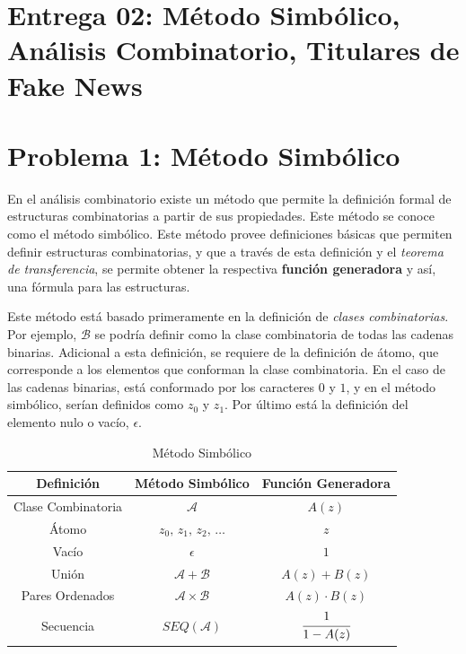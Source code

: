 \clearpage\section{Entrega 02: Método Simbólico, Análisis Combinatorio, Titulares de Fake News}
\section*{Problema 1: Método Simbólico}
En el análisis combinatorio existe un método que permite la definición formal de estructuras combinatorias a partir de sus propiedades. Este método se conoce como el método simbólico. Este método provee definiciones básicas que permiten definir estructuras combinatorias, y que a través de esta definición y el \textit{teorema de transferencia}, se permite obtener la respectiva \textbf{función generadora} y así, una fórmula para las estructuras.

Este método está basado primeramente en la definición de \textit{clases combinatorias}. Por ejemplo, $\mathcal{B}$ se podría definir como la clase combinatoria de todas las cadenas binarias. Adicional a esta definición, se requiere de la definición de átomo, que corresponde a los elementos que conforman la clase combinatoria. En el caso de las cadenas binarias, está conformado por los caracteres $0$ y $1$, y en el método simbólico, serían definidos como $z_0$ y $z_1$. Por último está la definición del elemento nulo o vacío, $\epsilon$.

\begin{table}[h!]
    \centering
    \begin{tabular}{|c|c|c|}
    \hline
        Definición &  Método Simbólico & Función Generadora\\
    \hline
        Clase Combinatoria & $\mathcal{A}$ &  $A(z)$\\
    \hline
        Átomo & $z_0,\,z_1,\,z_2,\,\dots$ & $z$ \\
    \hline 
        Vacío & $\epsilon$ & $1$ \\
    \hline
        Unión  & $\mathcal{A} + \mathcal{B}$ & $A(z) + B(z)$\\
    \hline
        Pares Ordenados & $\mathcal{A}\times\mathcal{B}$ & $A(z)\cdot B(z)$\\
    \hline
        Secuencia &  $SEQ(\mathcal{A})$ & $\cfrac{1}{1-A(z)}$\\
    \hline
    \end{tabular}
    \caption{Método Simbólico}
    \label{tab:sym_method}
\end{table}

